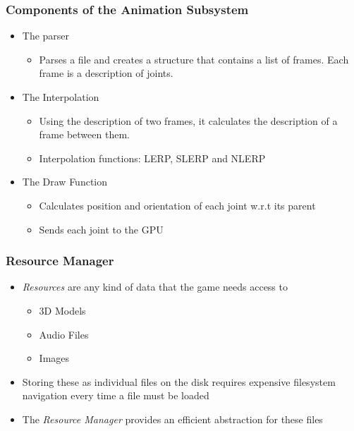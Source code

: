 \documentclass{beamer}
\begin{document}
\begin{frame}
   \frametitle{Components of the Animation Subsystem}
   \begin{itemize}
      \item The parser
         \begin{itemize}
            \item Parses a file and creates a structure that contains a list of
            frames. Each frame is a description of joints.
         \end{itemize}
      \item The Interpolation
         \begin{itemize}
            \item Using the description of two frames, it calculates the
            description of a frame between them. 
            \item Interpolation functions: LERP, SLERP and NLERP
         \end{itemize}
      \item The Draw Function
         \begin{itemize}
            \item Calculates position and orientation of each joint w.r.t its
            parent
            \item Sends each joint to the GPU
         \end{itemize}
   \end{itemize}
\end{frame}

\begin{frame}
   \frametitle{Resource Manager}
   \begin{itemize}
      \item \emph{Resources} are any kind of data that the game needs access to
      \begin{itemize}
         \item 3D Models
         \item Audio Files
         \item Images
      \end{itemize}
      \item Storing these as individual files on the disk requires expensive
      filesystem navigation every time a file must be loaded
      \item The \emph{Resource Manager} provides an efficient abstraction for
      these files
   \end{itemize}
\end{frame}
\end{document}

